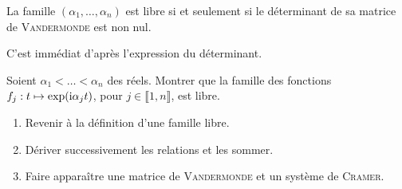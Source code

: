 \begin{corol}
    La famille $(\alpha_1, \dots, \alpha_n)$ est libre si et seulement si le déterminant de sa matrice de \textsc{Vandermonde} est non nul.
\end{corol}

\begin{preuve}
    C'est immédiat d'après l'expression du déterminant.
\end{preuve}

\begin{exercice}
    Soient $\alpha_1 < \dots < \alpha_n$ des réels. Montrer que la famille des fonctions $f_j:t \mapsto \exp(\mathrm{i} \alpha_j t)$, pour $j \in \llbracket 1,n \rrbracket$, est libre.
\end{exercice}

\begin{elem_sol}
    \begin{enumerate}
        \item Revenir à la définition d'une famille libre.
        \item Dériver successivement les relations et les sommer. 
        \item Faire apparaître une matrice de \textsc{Vandermonde} et un système de \textsc{Cramer}. 
    \end{enumerate}
\end{elem_sol}
